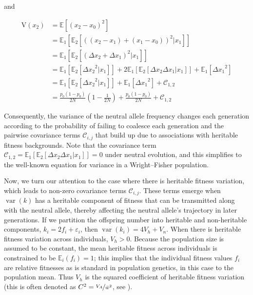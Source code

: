 \documentclass[11pt]{article}
\newcommand{\E}{\mathbb{E}}
\newcommand{\V}{\text{V}}
\DeclareMathOperator{\var}{var}
\begin{document}
and

\begin{align}
  \label{eq:var_wf}
  \V(x_2) &= \E\left[(x_2 - x_0)^2\right] \\
          &= \E_1\left[\E_2\left[((x_2-x_1) + (x_1 - x_0))^2 | x_1\right]\right] \\
          &= \E_1\left[\E_2\left[(\Delta x_2 + \Delta x_1)^2 | x_1\right]\right] \\
          &= \E_1\left[\E_2\left[{\Delta x_2}^2|x_1\right]\right] + 2\E_1\left[\E_2[\Delta x_2 \Delta x_1 | x_1]\right] + \E_1\left[ {\Delta x_1}^2\right] \\
          &= \E_1\left[\E_2\left[{\Delta x_2}^2|x_1\right]\right] + \E_1\left[ {\Delta x_1}^2\right] + \mathcal{C}_{1,2} \\
          &= \frac{p_0(1-p_0)}{2N}\left(1 - \frac{1}{2N}\right) + \frac{p_0(1-p_0)}{2N} + \mathcal{C}_{1,2}
\end{align}

Consequently, the variance of the neutral allele frequency changes each
generation according to the probability of failing to coalesce each generation
and the pairwise covariance terms $\mathcal{C}_{i,j}$ that build up due to associations
with heritable fitness backgrounds. Note that the covariance term $\mathcal{C}_{1,2} =
\E_1\left[\E_2[\Delta x_2 \Delta x_1 | x_1]\right] = 0$ under neutral
evolution, and this simplifies to the well-known equation for variance in a
Wright--Fisher population.

Now, we turn our attention to the case where there is heritable fitness
variation, which leads to non-zero covariance terms $\mathcal{C}_{i,j}$. These
terms emerge when $\var(k)$ has a heritable component of fitness that can be
transmitted along with the neutral allele, thereby affecting the neutral
allele's trajectory in later generations. If we partition the offspring number
into heritable and non-heritable components, $k_i = 2f_i + \varepsilon_i$, then
$\var(k_i) = 4 V_h + V_n$. When there is heritable fitness variation across
individuals, $V_h > 0$. Because the population size is assumed to be constant,
the mean heritable fitness across individuals is constrained to be $\E_i(f_i) =
1$; this implies that the individual fitness values $f_i$ are relative
fitnesses as is standard in population genetics, in this case to the population
mean. Thus $V_h$ is the squared coefficient of heritable fitness variation
(this is often denoted as $C^2 = \nicefrac{V_A}{\bar{w}^2}$, see
\cite{Crow1958-pc,Charlesworth1987-ab,Houle1992-ur}).
\end{document}
